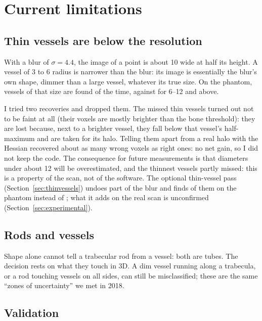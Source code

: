 \chapter{Current limitations}
\label{chap:limitations}

\section{Thin vessels are below the resolution}
\label{sec:thin}

With a blur of $\sigma = 4.4$\um{}, the image of a point is about 10\um{} wide at half its height. A
vessel of 3 to 6\um{} radius is narrower than the blur: its image is essentially the blur's own shape,
dimmer than a large vessel, whatever its true size. On the phantom, vessels of that size are found
\pbValueVesselRecallThin{} of the time, against \pbValueVesselRecallMedium{} for 6--12\um{} and
\pbValueVesselRecallLarge{} above.

I tried two recoveries and dropped them. The missed thin vessels turned out not to be faint at all (their
voxels are mostly brighter than the bone threshold): they are lost because, next to a brighter vessel,
they fall below that vessel's half-maximum and are taken for its halo. Telling them apart from a real
halo with the Hessian recovered about as many wrong voxels as right ones: no net gain, so I did not
keep the code. The
consequence for future measurements is that diameters under about 12\um{} will be overestimated, and
the thinnest vessels partly missed: this is a property of the scan, not of the software. The optional
thin-vessel pass (Section~\ref{sec:thinvessels}) undoes part of the blur and finds
\pbValueExpThinThinRecall{} of them on the phantom instead of \pbValueVesselRecallThin; what it adds
on the real scan is unconfirmed (Section~\ref{sec:experimental}).

\section{Rods and vessels}

Shape alone cannot tell a trabecular rod from a vessel: both are tubes. The decision rests on what they
touch in 3D. A dim vessel running along a trabecula, or a rod touching vessels on all sides, can still
be misclassified; these are the same ``zones of uncertainty'' we met in 2018.

\section{Validation}

